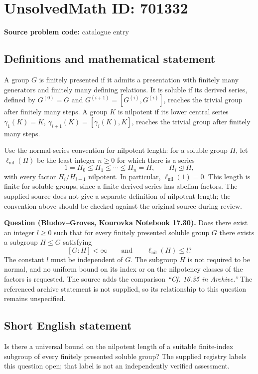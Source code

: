 \documentclass[11pt]{article}
\begin{document}
\section*{UnsolvedMath ID: 701332}
\textbf{Source problem code:} catalogue entry
\subsection{Definitions and mathematical statement}
A group \(G\) is finitely presented if it admits a presentation with finitely many generators and finitely many defining relations. It is soluble if its derived series, defined by \(G^{(0)}=G\) and \(G^{(i+1)}=[G^{(i)},G^{(i)}]\), reaches the trivial group after finitely many steps. A group \(K\) is nilpotent if its lower central series \(\gamma_1(K)=K\), \(\gamma_{i+1}(K)=[\gamma_i(K),K]\), reaches the trivial group after finitely many steps.

Use the normal-series convention for nilpotent length: for a soluble group \(H\), let \(\ell_{\mathrm{nil}}(H)\) be the least integer \(n\geq 0\) for which there is a series
\[
1=H_0\leq H_1\leq\cdots\leq H_n=H,
\qquad H_i\trianglelefteq H,
\]
with every factor \(H_i/H_{i-1}\) nilpotent. In particular, \(\ell_{\mathrm{nil}}(1)=0\). This length is finite for soluble groups, since a finite derived series has abelian factors. The supplied source does not give a separate definition of nilpotent length; the convention above should be checked against the original source during review.

\textbf{Question (Bludov--Groves, Kourovka Notebook 17.30).} Does there exist an integer \(l\geq 0\) such that for every finitely presented soluble group \(G\) there exists a subgroup \(H\leq G\) satisfying
\[
[G:H]<\infty
\qquad\text{and}\qquad
\ell_{\mathrm{nil}}(H)\leq l?
\]
The constant \(l\) must be independent of \(G\). The subgroup \(H\) is not required to be normal, and no uniform bound on its index or on the nilpotency classes of the factors is requested. The source adds the comparison \emph{``Cf. 16.35 in Archive.''} The referenced archive statement is not supplied, so its relationship to this question remains unspecified.
\subsection{Short English statement}
Is there a universal bound on the nilpotent length of a suitable finite-index subgroup of every finitely presented soluble group? The supplied registry labels this question open; that label is not an independently verified assessment.
\end{document}
